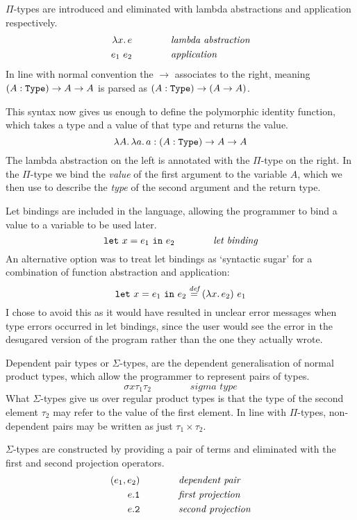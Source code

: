 \documentclass[12pt,a4paper,twoside]{report}
\begin{document}
\(\Pi\)-types are introduced and eliminated with lambda abstractions and application respectively.
\begin{align*}
    \lambda x \ldotp e \qquad\qquad & \textit{lambda abstraction} \\
    e_1\ e_2 \qquad\qquad & \textit{application}
\end{align*}
In line with normal convention the \(\rightarrow\) associates to the right, meaning \((A : \mathtt{Type}{}) \rightarrow A \rightarrow A\) is parsed as \((A : \mathtt{Type}{}) \rightarrow (A \rightarrow A)\).

This syntax now gives us enough to define the polymorphic identity function, which takes a type and a value of that type and returns the value.
\[
    \lambda A \ldotp \lambda a \ldotp a : (A : \mathtt{Type}{}) \rightarrow A \rightarrow A
\]
The lambda abstraction on the left is annotated with the \(\Pi\)-type on the right.
In the \(\Pi\)-type we bind the \emph{value} of the first argument to the variable \(A\), which we then use to describe the \emph{type} of the second argument and the return type.

Let bindings are included in the language, allowing the programmer to bind a value to a variable to be used later.
\[
    \mathtt{let}\ x = e_1\ \mathtt{in}\ e_2 \qquad\qquad \textit{let binding}
\]
An alternative option was to treat let bindings as `syntactic sugar' for a combination of function abstraction and application:
\[
    \mathtt{let}\ x = e_1\ \mathtt{in}\ e_2 \overset{\textit{def}}{=} (\lambda x \ldotp e_2)\ e_1
\]
I chose to avoid this as it would have resulted in unclear error messages when type errors occurred in let bindings, since the user would see the error in the desugared version of the program rather than the one they actually wrote.

Dependent pair types or \(\Sigma\)-types, are the dependent generalisation of normal product types, which allow the programmer to represent pairs of types.
\[
    \sigma{x}{\tau_1}{\tau_2} \qquad\qquad \textit{sigma type}
\]
What \(\Sigma\)-types give us over regular product types is that the type of the second element \(\tau_2\) may refer to the value of the first element.
In line with \(\Pi\)-types, non-dependent pairs may be written as just \(\tau_1 \times \tau_2\).

\(\Sigma\)-types are constructed by providing a pair of terms and eliminated with the first and second projection operators.
\begin{align*}
    (e_1, e_2) \qquad\qquad &\textit{dependent pair} \\
    e\mathtt{.1} \qquad\qquad &\textit{first projection} \\
    e\mathtt{.2} \qquad\qquad &\textit{second projection}
\end{align*}
\end{document}

